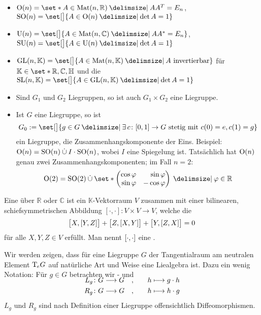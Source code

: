 \begin{beispiel*}[{name=[{Liegruppen}]}]
\begin{itemize}
		\emph{In Übungsaufgabe 3 werden diese Behauptungen bewiesen. Siehe \cref{sec:aufg3}.}
		\item {} $\On(n) = \set*{A \in \Mat(n,\mathbb{R}) \given A A^T = E_n}$, $\SO(n) = \set[\big]{A \in \On(n) \given \det A=1}$
		\item {} $\Un(n) = \set[\big]{A \in \Mat (n,\mathbb{C}) \given A A^* =E_n}$, $\SU(n) = \set[\big]{A \in \Un(n) \given \det A=1}$
		\item {} $\GL(n,\mathbb{K}) = \set[\big]{A \in \Mat(n,\mathbb{K}) \given A \text{ invertierbar}}$ für $\mathbb{K} \in  \set*{\mathbb{R},\mathbb{C},\mathbb{H}}$ und die 
		$\SL(n,\mathbb{K}) = \set[\big]{A \in \GL(n,\mathbb{K}) \given \det A =1}$
		\item Sind $G_1$ und $G_2$ Liegruppen, so ist auch $G_1 \times G_2$ eine Liegruppe.
		\item Ist $G$ eine Liegruppe, so ist
		\[
			G_0 :=  \set[\big]{g \in G \given \exists\, c \colon [0,1] \to G \text{ stetig mit } c(0)=e, c(1)=g}
		\]
		ein Liegruppe, die Zusammenhangskomponente der Eins.
		Beispiel: $\On(n)=\SO(n) \mathbin{\dot{\cup}} I \cdot \SO(n)$, wobei $I$ eine Spiegelung ist.
		Tatsächlich hat $\On(n)$ genau zwei Zusammenhangskomponenten; im Fall $n=2$:
		\[
			\On(2) = \SO(2) \mathbin{\dot{\cup}} \set*{\begin{pmatrix*}[r]
				\cos \varphi & \sin \varphi \\
				\sin \varphi & - \cos \varphi
			\end{pmatrix*} \given \varphi \in \mathbb{R}}
		\]
	\end{itemize}
\end{beispiel*}

\begin{definition}[{name=[Liealgebra und Lieklammer]}]
	Eine  über $\mathbb{R}$ oder $\mathbb{C}$ ist ein $\mathbb{K}$-Vektorraum $V$ zusammen mit einer bilinearen, schiefsymmetrischen Abbildung 
	\(
		[\cdot ,\cdot ] \colon V \times V \to V
	\),
	welche die  
	\[
		\benbrace[\big]{X, \benbrace*{Y,Z}} + \benbrace[\big]{Z, \benbrace*{X,Y}} + \benbrace[\big]{Y, \benbrace*{Z,X}} =0
	\]
	für alle $X,Y,Z \in V$ erfüllt.
	Man nennt $\benbrace*{\cdot ,\cdot }$ eine . 
\end{definition}

Wir werden zeigen, dass für eine Liegruppe $G$ der Tangentialraum am neutralen Element $\Tmap_e G$ auf natürliche Art und Weise eine Liealgebra ist.
Dazu ein wenig Notation: Für $g \in G$ betrachten wir - und 
\begin{align}
	\SwapAboveDisplaySkip
	L_g \colon G \longrightarrow G \quad , \qquad &h \longmapsto g \cdot h \\
	R_g \colon G \longrightarrow G \quad , \qquad &h \longmapsto h \cdot g
\end{align}
$L_g$ und $R_g$ sind nach Definition einer Liegruppe offensichtlich Diffeomorphismen.


